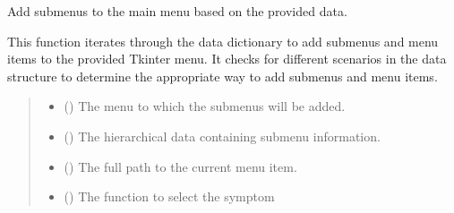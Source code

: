 \documentclass[letterpaper,10pt,english]{sphinxmanual}
\begin{document}
\begin{fulllineitems}
\label{\detokenize{annotation:annotation.exel_menus.add_submenus}}
\pysigstartsignatures
{}
\pysigstopsignatures
\sphinxAtStartPar
Add submenus to the main menu based on the provided data.

\sphinxAtStartPar
This function iterates through the data dictionary to add submenus
and menu items to the provided Tkinter menu. It checks for different
scenarios in the data structure to determine the appropriate way to
add submenus and menu items.
\begin{quote}\begin{description}
\begin{itemize}
\item {} 
\sphinxAtStartPar
{} () \textendash{} The menu to which the submenus will be added.

\item {} 
\sphinxAtStartPar
{} () \textendash{} The hierarchical data containing submenu information.

\item {} 
\sphinxAtStartPar
{} () \textendash{} The full path to the current menu item.

\item {} 
\sphinxAtStartPar
{} () \textendash{} The function to select the symptom

\end{itemize}

\end{description}\end{quote}

\end{fulllineitems}

\end{document}
